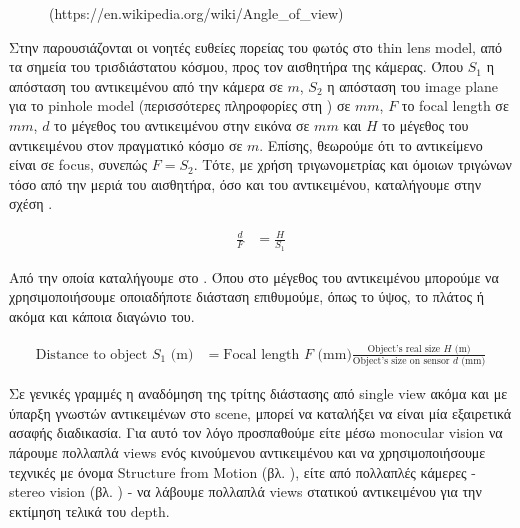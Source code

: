 \begin{figure} [H]
\begin{minipage}{.6\textwidth}
			\decoRule
			(https://en.wikipedia.org/wiki/Angle\_of\_view) 
			\label{fig:optical-axis-from-object-to-camera-sensor}
		\end{minipage}
\end{figure}

Στην  παρουσιάζονται οι νοητές ευθείες πορείας του φωτός στο thin lens model, από τα σημεία του τρισδιάστατου κόσμου, προς τον αισθητήρα της κάμερας. Όπου $S_1$ η απόσταση του αντικειμένου από την κάμερα σε $m$, $S_2$ η απόσταση του image plane για το pinhole model (περισσότερες πληροφορίες στη ) σε $mm$, $F$ το focal length σε $mm$, $d$ το μέγεθος του αντικειμένου στην εικόνα σε $mm$ και $H$ το μέγεθος του αντικειμένου στον πραγματικό κόσμο σε $m$. Επίσης, θεωρούμε ότι το αντικείμενο είναι σε focus, συνεπώς $F=S_2$. Τότε, με χρήση τριγωνομετρίας και όμοιων τριγώνων τόσο από την μεριά του αισθητήρα, όσο και του αντικειμένου, καταλήγουμε στην σχέση  \cite{calculate-distance-or-size-of-an-objectin-a-photo-image} \cite{calculate-distance-opencv} \cite{calculate-distance-stackexchange}.

\begin{align}
	\frac{d}{F} &= \frac{H}{S_1} \label{eq:distance-from-object-dim-triangles}
\end{align}

Από την οποία καταλήγουμε στο . Όπου στο μέγεθος του αντικειμένου μπορούμε να χρησιμοποιήσουμε οποιαδήποτε διάσταση επιθυμούμε, όπως το ύψος, το πλάτος ή ακόμα και κάποια διαγώνιο του.

\begin{align}
	\textrm{Distance to object $S_1$ (m)} &= \textrm{Focal length $F$ (mm)}\frac{\textrm{Object's real size $H$ (m)}}{\textrm{Object's size on sensor $d$ (mm)}} \label{eq:distance-from-object}
\end{align}

Σε γενικές γραμμές η αναδόμηση της τρίτης διάστασης από single view ακόμα και με ύπαρξη γνωστών αντικειμένων στο scene, μπορεί να καταλήξει να είναι μία εξαιρετικά ασαφής διαδικασία. Για αυτό τον λόγο προσπαθούμε είτε μέσω monocular vision να πάρουμε πολλαπλά views ενός κινούμενου αντικειμένου και να χρησιμοποιήσουμε τεχνικές με όνομα Structure from Motion (βλ. ), είτε από πολλαπλές κάμερες - stereo vision (βλ. ) - να λάβουμε πολλαπλά views στατικού αντικειμένου για την εκτίμηση τελικά του depth. 

